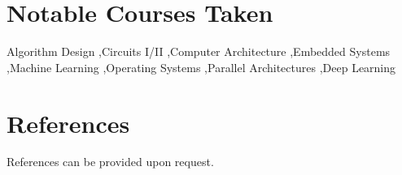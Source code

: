 \documentclass{resume}
\begin{document}
\section*{Notable Courses Taken}

\newcommand{\course}[2]{#1}

    \course{Algorithm Design}{ECS 122A/B}
\sep\course{Circuits I/II}{ENG 17/EEC 100}
\sep\course{Computer Architecture}{ECS 154A/B}
\sep\course{Embedded Systems}{EEC 172}
\sep\course{Machine Learning}{ECS 171}
\sep\course{Operating Systems}{ECS 150}
\sep\course{Parallel Architectures}{ECS 158}
\sep\course{Deep Learning}{ECS 289G}

\section*{References}

References can be provided upon request.

%
\end{document}
